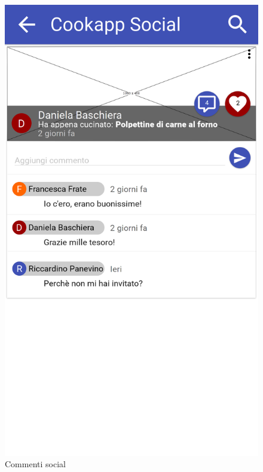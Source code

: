\begin{figure}[H]
\begin{minipage}{.49\textwidth}
		\includegraphics[width=\textwidth]{img/wireframe/commenti.png}
		\caption{Commenti social}
		\label{fig:commenti_social}
	\end{minipage}
\end{figure}	
